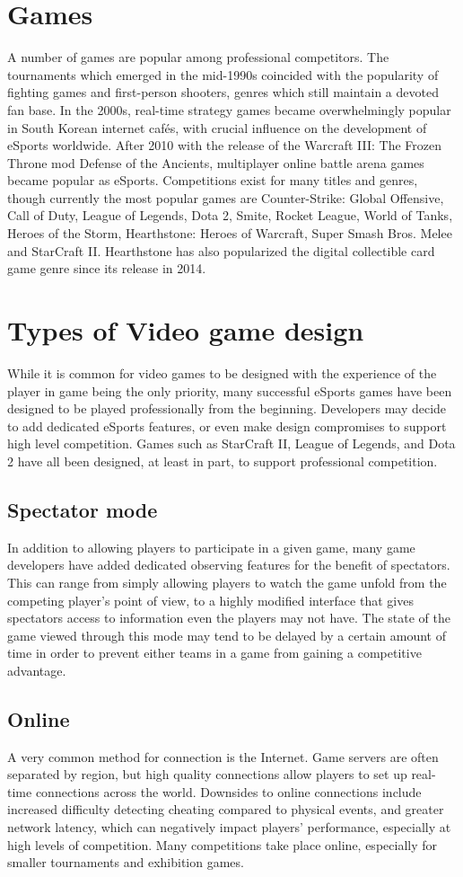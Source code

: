 \section{Games}
	A number of games are popular among professional competitors. The tournaments which emerged in the mid-1990s coincided with the popularity of fighting games and first-person shooters, genres which still maintain a devoted fan base. In the 2000s, real-time strategy games became overwhelmingly popular in South Korean internet cafés, with crucial influence on the development of eSports worldwide. After 2010 with the release of the Warcraft III: The Frozen Throne mod Defense of the Ancients, multiplayer online battle arena games became popular as eSports. Competitions exist for many titles and genres, though currently the most popular games are Counter-Strike: Global Offensive, Call of Duty, League of Legends, Dota 2, Smite, Rocket League, World of Tanks, Heroes of the Storm, Hearthstone: Heroes of Warcraft, Super Smash Bros. Melee and StarCraft II. Hearthstone has also popularized the digital collectible card game genre since its release in 2014.

\section{Types of Video game design}
	While it is common for video games to be designed with the experience of the player in game being the only priority, many successful eSports games have been designed to be played professionally from the beginning. Developers may decide to add dedicated eSports features, or even make design compromises to support high level competition. Games such as StarCraft II, League of Legends, and Dota 2 have all been designed, at least in part, to support professional competition.
	\subsection{Spectator mode}
		In addition to allowing players to participate in a given game, many game developers have added dedicated observing features for the benefit of spectators. This can range from simply allowing players to watch the game unfold from the competing player's point of view, to a highly modified interface that gives spectators access to information even the players may not have. The state of the game viewed through this mode may tend to be delayed by a certain amount of time in order to prevent either teams in a game from gaining a competitive advantage.
	\subsection{Online}
		A very common method for connection is the Internet. Game servers are often separated by region, but high quality connections allow players to set up real-time connections across the world. Downsides to online connections include increased difficulty detecting cheating compared to physical events, and greater network latency, which can negatively impact players' performance, especially at high levels of competition. Many competitions take place online, especially for smaller tournaments and exhibition games.
